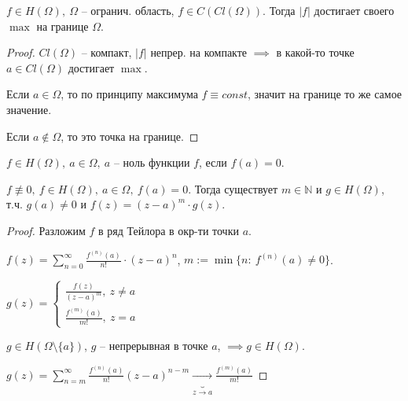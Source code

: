 \begin{consequence}
    $f \in H(\Omega), \ \Omega$ -- огранич. область, $f \in C(Cl (\Omega))$. Тогда $|f|$ достигает своего $\max$ на границе $\Omega$.
\end{consequence}

\begin{proof}
    $Cl (\Omega)$ -- компакт, $|f|$ непрер. на компакте $\implies$ в какой-то точке $a \in Cl (\Omega)$ достигает $\max$.

    Если $a \in \Omega$, то по принципу максимума $f \equiv const$, значит на границе то же самое значение.

    Если $a \not \in \Omega$, то это точка на границе.
\end{proof}



\begin{definition}
    $f \in H(\Omega), \ a \in \Omega, \ a$ -- ноль функции $f$, если $f(a) = 0$.
\end{definition}

\begin{theorem}
    $f \not \equiv 0, \ f \in H(\Omega), \ a \in \Omega, \ f(a) = 0$. Тогда существует $m \in \mathbb{N}$ и $g \in H(\Omega)$, т.ч. $g(a) \not = 0$ и $f(z) = (z - a)^{m} \cdot g(z)$.
\end{theorem}
\begin{proof}
    Разложим $f$ в ряд Тейлора в окр-ти точки $a$.

    $f(z) = \sum_{n=0}^{\infty} { \frac{f^{(n)} (a)}{n!} \cdot (z - a)^{n} }$, $m := \min \{ n : \ f^{(n)} (a) \not = 0 \}$.

    $g(z) = \begin{cases}
        \frac{f(z)}{(z - a)^{m}}, \ z \not = a \\
        \frac{f^{(m)} (a)}{m!}, \ z = a
    \end{cases}$

    $g \in H(\Omega \setminus \{a\})$, $g$ -- непрерывная в точке $a$,  $\implies g \in H(\Omega)$.

    $g(z) = \sum_{n=m}^{\infty} { \frac{f^{(n)} (a)}{n!} (z - a)^{n - m} } \underbrace{\rightarrow}_{z \rightarrow a} \frac{f^{(m)} (a)}{m!}$
\end{proof}


